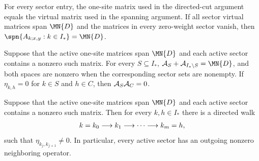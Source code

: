\begin{lemma}%
    \label{thm:mpdo_active_one_site_matrix_spanning}
    \leanok
    For every sector entry, the one-site matrix used in the directed-cut
    argument equals the virtual matrix used in the spanning argument. If all
    sector virtual matrices span $\MN{D}$ and the matrices in every
    zero-weight sector vanish, then
    $\spn\{A_{k;x,y}:k\in I_*\}=\MN{D}$.
\end{lemma}

\begin{lemma}%
    \label{thm:mpdo_active_sector_complementary_spaces}
    \leanok
    Suppose that the active one-site matrices span $\MN{D}$ and each active
    sector contains a nonzero such matrix. For every $S\subseteq I_*$,
    ${\cal A}_S+{\cal A}_{I_*\setminus S}=\MN{D}$, and both spaces are
    nonzero when the corresponding sector sets are nonempty. If
    $\eta_{k,h}=0$ for $k\in S$ and $h\in C$, then
    ${\cal A}_S{\cal A}_C=0$.
\end{lemma}

\begin{lemma}%
    \label{thm:mpdo_active_neighboring_support_strongly_connected}
    \leanok
    Suppose that the active one-site matrices span $\MN{D}$ and each active
    sector contains a nonzero such matrix. Then for every $k,h\in I_*$ there
    is a directed walk
    \begin{align}
        k=k_0\longrightarrow k_1\longrightarrow\cdots
        \longrightarrow k_m=h,
        \notag
    \end{align}
    such that $\eta_{k_j,k_{j+1}}\ne0$. In particular, every active sector
    has an outgoing nonzero neighboring operator.
\end{lemma}

